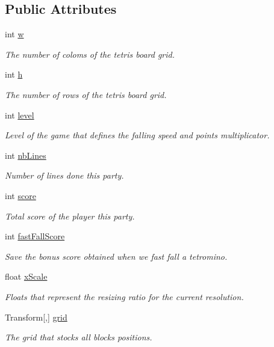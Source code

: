 \subsection*{Public Attributes}
\begin{DoxyCompactItemize}
\item 
int \hyperlink{class_grid_a66f83d135d340250e07d80e25ef727c6}{w}
\begin{DoxyCompactList}\small\item\em The number of coloms of the tetris board grid. \end{DoxyCompactList}\item 
int \hyperlink{class_grid_a639069cb7876f736d27f2bc37563f8fb}{h}
\begin{DoxyCompactList}\small\item\em The number of rows of the tetris board grid. \end{DoxyCompactList}\item 
int \hyperlink{class_grid_aaecc1ecaff3fce790af5bb4c30e875cb}{level}
\begin{DoxyCompactList}\small\item\em Level of the game that defines the falling speed and points multiplicator. \end{DoxyCompactList}\item 
int \hyperlink{class_grid_a3c8ccfb19a0a98bc8b9614e680bf57cb}{nb\-Lines}
\begin{DoxyCompactList}\small\item\em Number of lines done this party. \end{DoxyCompactList}\item 
int \hyperlink{class_grid_abe3bc085c9b1b24a21eb7aae3d50ecf2}{score}
\begin{DoxyCompactList}\small\item\em Total score of the player this party. \end{DoxyCompactList}\item 
int \hyperlink{class_grid_ac6d14039537f2afaf05248771dcf4255}{fast\-Fall\-Score}
\begin{DoxyCompactList}\small\item\em Save the bonus score obtained when we fast fall a tetromino. \end{DoxyCompactList}\item 
float \hyperlink{class_grid_a0fbf74559ec1e8015a6a2ad71d40847c}{x\-Scale}
\begin{DoxyCompactList}\small\item\em Floats that represent the resizing ratio for the current resolution. \end{DoxyCompactList}\item 
Transform\mbox{[},\mbox{]} \hyperlink{class_grid_a018870cf72623dd6c95a6b18f496e2fd}{grid}
\begin{DoxyCompactList}\small\item\em The grid that stocks all blocks positions. \end{DoxyCompactList}\end{DoxyCompactItemize}

